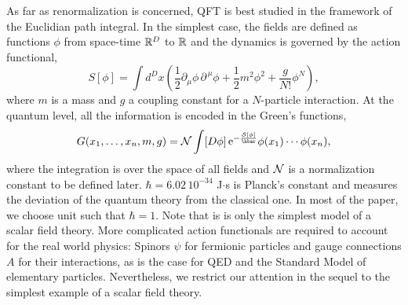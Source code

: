 \documentclass[12pt,here,feynmf]{article}
\begin{document}
As far as renormalization is concerned, QFT is best studied in the framework of the Euclidian path integral. In the simplest case, the fields are defined as functions $\phi$ from space-time ${\Bbb R}^{D}$ to ${\Bbb R}$ and the dynamics is governed by the action functional,
\begin{equation}
S[ \phi]=\int d^{D}x
\left(\frac{1}{2}\partial_{\mu}\phi\,\partial^{\,\mu}\phi+
\frac{1}{2}{m}^{2}\phi^{2}+
\frac{g}{N!}\phi^{N}\right),
\end{equation} 
where $m$ is a mass and $g$ a coupling constant for a $N$-particle interaction. At the quantum level, all the information is encoded in the Green's functions,
\begin{equation}
G(x_{1},\dots,x_{n},m,g)={\cal N}
\int[D\phi]\,\mathrm{e}^{-\frac{\cal{S}[ \phi]}{\hbar}}\phi(x_{1})\cdots\phi(x_{n}),\label{green}
\end{equation}
where the integration is over the space of all fields and ${}\cal N$ is a normalization constant to be defined later.  $\hbar=6.02\,10^{-34}$ J$\cdot$s is Planck's constant and measures the deviation of the quantum theory from the classical one. In most of the paper, we choose unit such that $\hbar=1$. Note that is is only the simplest model of a scalar field theory. More complicated action functionals are required to account for the real world physics: Spinors $\psi$ for fermionic particles and gauge connections $A$ for their interactions, as is the case for QED and the Standard Model of elementary particles. Nevertheless, we restrict our attention in the sequel to the simplest example of a scalar field theory.  
\end{document}
